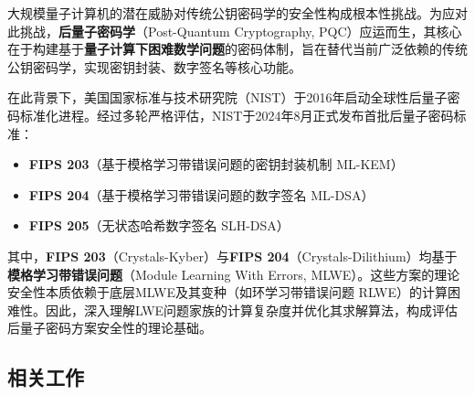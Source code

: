 \documentclass[12pt,a4paper]{article}
\numberwithin{equation}{section}
\begin{document}




大规模量子计算机的潜在威胁对传统公钥密码学的安全性构成根本性挑战。为应对此挑战，\textbf{后量子密码学}（Post-Quantum Cryptography, PQC）应运而生，其核心在于构建基于\textbf{量子计算下困难数学问题}的密码体制，旨在替代当前广泛依赖的传统公钥密码学，实现密钥封装、数字签名等核心功能。

在此背景下，美国国家标准与技术研究院（NIST）于2016年启动全球性后量子密码标准化进程。经过多轮严格评估，NIST于2024年8月正式发布首批后量子密码标准：
\begin{itemize}
    \item \textbf{FIPS 203}（基于模格学习带错误问题的密钥封装机制 ML-KEM）
    \item \textbf{FIPS 204}（基于模格学习带错误问题的数字签名 ML-DSA）
    \item \textbf{FIPS 205}（无状态哈希数字签名 SLH-DSA）
\end{itemize}
其中，\textbf{FIPS 203}（Crystals-Kyber）与\textbf{FIPS 204}（Crystals-Dilithium）均基于\textbf{模格学习带错误问题}（Module Learning With Errors, MLWE）。这些方案的理论安全性本质依赖于底层MLWE及其变种（如环学习带错误问题 RLWE）的计算困难性。因此，深入理解LWE问题家族的计算复杂度并优化其求解算法，构成评估后量子密码方案安全性的理论基础。

\subsection*{相关工作}
\end{document}
